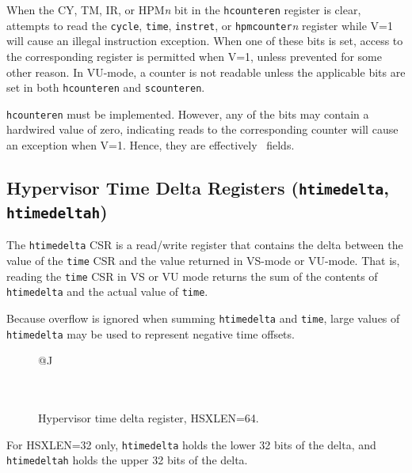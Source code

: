 When the CY, TM, IR, or HPM{\em n} bit in the {\tt hcounteren} register
is clear, attempts to read the {\tt cycle}, {\tt time}, {\tt instret}, or
{\tt hpmcounter}{\em n} register while V=1 will cause an illegal
instruction exception.
When one of these bits is set, access to the corresponding register is
permitted when V=1, unless prevented for some other reason.
In VU-mode, a counter is not readable unless the applicable bits are set
in both {\tt hcounteren} and {\tt scounteren}.

{\tt hcounteren} must be implemented.
However, any of the bits may contain a hardwired value of zero,
indicating reads to the corresponding counter will cause an exception
when V=1.
Hence, they are effectively \warl\ fields.

\subsection{Hypervisor Time Delta Registers ({\tt htimedelta}, {\tt htimedeltah})}

The {\tt htimedelta} CSR is a read/write register that contains the delta
between the value of the {\tt time} CSR and the value returned in VS-mode or
VU-mode.
That is, reading the {\tt time} CSR in VS or VU mode returns the sum of the
contents of {\tt htimedelta} and the actual value of {\tt time}.

\begin{commentary}
Because overflow is ignored when summing {\tt htimedelta} and {\tt time},
large values of {\tt htimedelta} may be used to represent negative time
offsets.
\end{commentary}

\begin{figure*}[h!]
{\footnotesize
\begin{center}
\begin{tabular}{@{}J}
 \\
\hline
{} \\
 \\
\end{tabular}
\end{center}
}
\vspace{-0.1in}
\caption{Hypervisor time delta register, HSXLEN=64.}
\label{hdeltareg}
\end{figure*}

For HSXLEN=32 only, {\tt htimedelta} holds the lower 32 bits of the
delta, and {\tt htimedeltah} holds the upper 32 bits of the delta.

